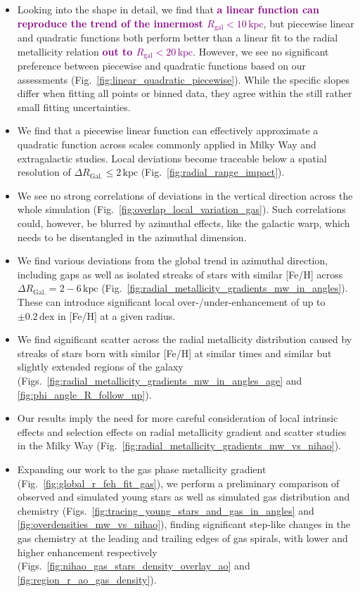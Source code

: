 \documentclass[twocolumn,apj,numberedappendix,appendixfloats,twocolappendix]{openjournal}
\newcommand{\adjusted}[1]{\textbf{\textcolor{purple}{#1}}}
\begin{document}
\begin{CJK*}{UTF8}{gbsn}
\begin{itemize}[left=0.3cm]
    \item Looking into the shape in detail, we find that \adjusted{a linear function can reproduce the trend of the innermost $R_\mathrm{gal} < 10\,\mathrm{kpc}$}, but piecewise linear and quadratic functions both perform better than a linear fit to the radial metallicity relation \adjusted{out to $R_\mathrm{gal} < 20\,\mathrm{kpc}$}. However, we see no significant preference between piecewise and quadratic functions based on our assessments (Fig.~\ref{fig:linear_quadratic_piecewise}). While the specific slopes differ when fitting all points or binned data, they agree within the still rather small fitting uncertainties.
    \item We find that a piecewise linear function can effectively approximate a quadratic function across scales commonly applied in Milky Way and extragalactic studies. Local deviations become traceable below a spatial resolution of $\Delta R_\mathrm{Gal.} \leq 2\,\mathrm{kpc}$ (Fig.~\ref{fig:radial_range_impact}).
    \item We see no strong correlations of deviations in the vertical direction across the whole simulation (Fig.~\ref{fig:overlap_local_variation_gas}). Such correlations could, however, be blurred by azimuthal effects, like the galactic warp, which needs to be disentangled in the azimuthal dimension. 
    \item We find various deviations from the global trend in azimuthal direction, including gaps as well as isolated streaks of stars with similar [Fe/H] across $\Delta R_\mathrm{Gal.} = 2-6\,\mathrm{kpc}$ (Fig.~\ref{fig:radial_metallicity_gradients_mw_in_angles}). These can introduce significant local over-/under-enhancement of up to $\pm 0.2\,\mathrm{dex}$ in [Fe/H] at a given radius.
    \item We find significant scatter across the radial metallicity distribution caused by streaks of stars born with similar [Fe/H] at similar times and similar but slightly extended regions of the galaxy (Figs.~\ref{fig:radial_metallicity_gradients_mw_in_angles_age} and \ref{fig:phi_angle_R_follow_up}).
    \item Our results imply the need for more careful consideration of local intrinsic effects and selection effects on radial metallicity gradient and scatter studies in the Milky Way (Fig.~\ref{fig:radial_metallicity_gradients_mw_vs_nihao}).
    \item Expanding our work to the gas phase metallicity gradient (Fig.~\ref{fig:global_r_feh_fit_gas}), we perform a preliminary comparison of observed and simulated young stars as well as simulated gas distribution and chemistry (Figs.~\ref{fig:tracing_young_stars_and_gas_in_angles} and \ref{fig:overdensities_mw_vs_nihao}), finding significant step-like changes in the gas chemistry at the leading and trailing edges of gas spirals, with lower and higher enhancement respectively (Figs.~\ref{fig:nihao_gas_stars_density_overlay_ao} and \ref{fig:region_r_ao_gas_density}).

\end{itemize}
\end{CJK*}
\end{document}
